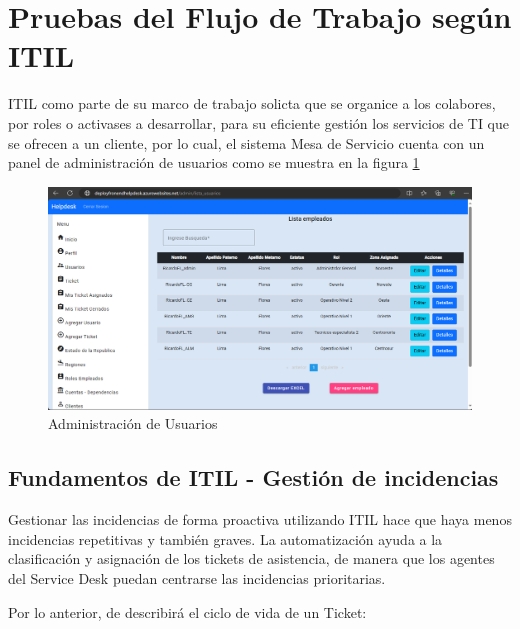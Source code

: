 \section{Pruebas del Flujo de Trabajo según ITIL}
ITIL como parte de su marco de trabajo solicta que se organice a los colabores, por roles o activases a desarrollar,  para su eficiente  gestión los servicios de TI que se ofrecen a un cliente, por lo cual, el sistema  Mesa de Servicio  cuenta con un panel de administración de usuarios como se muestra en la figura \ref{fig:user}
 \begin{figure}[H]
	\centering
	\includegraphics[width=1.1\textwidth]{Capitulo7/Img/usuarios}
	\caption{Administración de Usuarios}
	\label{fig:user}
\end{figure}

\subsection{Fundamentos de ITIL - Gestión de incidencias}

Gestionar las incidencias de forma proactiva utilizando ITIL hace que haya menos incidencias repetitivas y también graves. La automatización ayuda a la clasificación y asignación de los tickets de asistencia, de manera que los agentes del Service Desk puedan centrarse las incidencias prioritarias.

Por lo anterior, de describirá el ciclo de vida de un Ticket:

